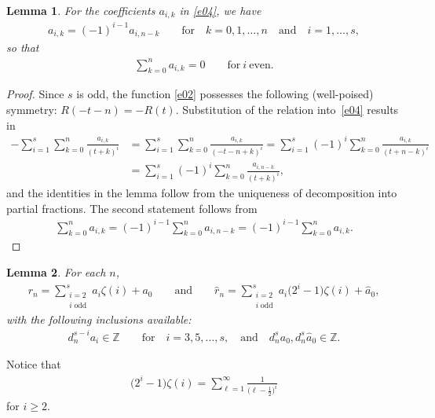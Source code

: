 \documentclass[11pt]{article}
\newtheorem{lemma}{Lemma}
\begin{document}
\begin{lemma}\label{l2} For the coefficients $a_{i,k}$ in \eqref{e04}, we have
\begin{gather*}
a_{i,k}=(-1)^{i-1}a_{i,n-k} \qquad\text{for}\quad k=0,1,\dots,n \quad\text{and}\quad i=1,\dots,s,
\end{gather*}
so that
\begin{gather*}
\sum_{k=0}^na_{i,k}=0 \qquad\text{for} \ i \ \text{even}.
\end{gather*}
\end{lemma}

\begin{proof}
Since $s$ is odd, the function \eqref{e02} possesses the following (well-poised) symmetry: $R(-t-n)=-R(t)$. Substitution of the relation into~\eqref{e04} results in
\begin{align*}
-\sum_{i=1}^s\sum_{k=0}^n\frac{a_{i,k}}{(t+k)^i}
&=\sum_{i=1}^s\sum_{k=0}^n\frac{a_{i,k}}{(-t-n+k)^i}=\sum_{i=1}^s(-1)^i\sum_{k=0}^n\frac{a_{i,k}}{(t+n-k)^i}\\
&=\sum_{i=1}^s(-1)^i\sum_{k=0}^n\frac{a_{i,n-k}}{(t+k)^i},
\end{align*}
and the identities in the lemma follow from the uniqueness of decomposition into partial fractions. The second statement follows from
\begin{gather*}
\sum_{k=0}^na_{i,k}=(-1)^{i-1}\sum_{k=0}^na_{i,n-k}=(-1)^{i-1}\sum_{k=0}^na_{i,k}.\tag*{\qed}
\end{gather*}
\renewcommand{\qed}{}
\end{proof}

\begin{lemma}\label{l3} For each $n$,
\begin{gather*}
r_n=\sum_{\substack{i=2\\i\;\text{odd}}}^sa_i\zeta(i)+a_0
\qquad\text{and}\qquad
\hat r_n=\sum_{\substack{i=2\\i\;\text{odd}}}^sa_i\big(2^i-1\big)\zeta(i)+\hat a_0,
\end{gather*}
with the following inclusions available\textup:
\begin{gather*}
d_n^{s-i}a_i\in\mathbb Z \qquad\text{for}\quad i=3,5,\dots,s,
\quad\text{and}\quad d_n^sa_0, d_n^s\hat a_0\in\mathbb Z.
\end{gather*}
\end{lemma}

Notice that
\begin{gather*}
\big(2^i-1\big)\zeta(i) =\sum_{\ell=1}^\infty\frac1{\big(\ell-\frac12\big)^i}
\end{gather*}
for $i\ge2$.
\end{document}
